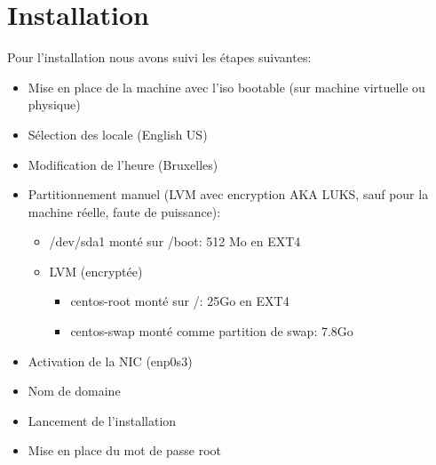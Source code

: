 \section{Installation}
Pour l'installation nous avons suivi les étapes suivantes:
\begin{itemize}
	\item Mise en place de la machine avec l'iso bootable (sur machine virtuelle ou physique)
	\item Sélection des locale (English US)
	\item Modification de l'heure (Bruxelles)
	\item Partitionnement manuel (LVM avec encryption AKA LUKS, sauf pour la machine réelle, faute de puissance):
	\begin{itemize}
		\item /dev/sda1 monté sur /boot: 512 Mo en EXT4
		\item LVM (encryptée)
		\begin{itemize}
			\item centos-root monté sur /: 25Go en EXT4
			\item centos-swap monté comme partition de swap: 7.8Go
		\end{itemize}
	\end{itemize}
	\item Activation de la NIC (enp0s3)
	\item Nom de domaine
	\item Lancement de l'installation
	\item Mise en place du mot de passe root
\end{itemize}

